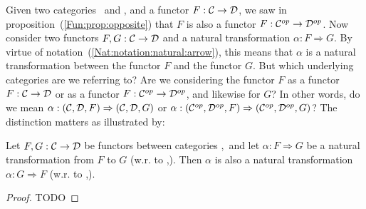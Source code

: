 Given two categories \Cat\ and \Dat, and a functor $F:\mbox{$\cal C$}\to\mbox{$\cal D$}$, we saw
in proposition~(\ref{Fun:prop:opposite}) that $F$ is also a functor 
$F:\mbox{${\cal C}^{op}$}\to\mbox{${\cal D}^{op}$}$. Now consider two functors $F,G:\mbox{$\cal C$}\to\mbox{$\cal D$}$ and a natural 
transformation $\alpha:F \Rightarrow G$. By virtue of 
notation~(\ref{Nat:notation:natural:arrow}), this means that $\alpha$ is a 
natural transformation between the functor $F$ and the functor $G$. But 
which underlying categories are we referring to? Are we considering
the functor $F$ as a functor $F:\mbox{$\cal C$}\to\mbox{$\cal D$}$ or as a functor $F:\mbox{${\cal C}^{op}$}\to\mbox{${\cal D}^{op}$}$,
and likewise for $G$? In other words, do we mean 
$\alpha:(\mbox{$\cal C$},\mbox{$\cal D$},F)\Rightarrow(\mbox{$\cal C$},\mbox{$\cal D$},G)$ or 
$\alpha:(\mbox{${\cal C}^{op}$},\mbox{${\cal D}^{op}$},F)\Rightarrow(\mbox{${\cal C}^{op}$},\mbox{${\cal D}^{op}$},G)$? The distinction matters
as illustrated by:

\begin{prop}
    Let $F,G:\mbox{$\cal C$}\to\mbox{$\cal D$}$ be functors between categories \Cat,\Dat\ and let 
    $\alpha:F\Rightarrow G$ be a natural transformation from $F$ to $G$ 
    (w.r. to \Cat,\Dat). Then $\alpha$ is also a natural transformation
    $\alpha:G\Rightarrow F$ (w.r. to \Cop,\Dop).
\end{prop}
\begin{proof}
TODO
\end{proof}


